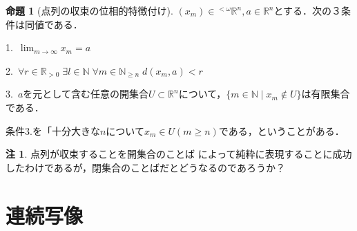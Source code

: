 \documentclass[uplatex, 12pt, dvipdfmx]{jsreport}
\theoremstyle{definition}
\newtheorem{proposition}[theorem]{命題}
\newtheorem{remark}[theorem]{注}
\theoremstyle{StatementsWithStar}
\theoremstyle{StatementsWithStar2}
\theoremstyle{StatementsWithStar3}
\theoremstyle{StatementsWithCCirc}
\theoremstyle{definition}
\begin{document}
\begin{proposition}[点列の収束の位相的特徴付け]\rm{}
    $(x_m)\in{}^{<\omega}\mathbb{R}^n, a\in\mathbb{R}^n$とする．次の３条件は同値である．

    1.\, $\lim_{m\to\infty}x_m=a$

    2.\, $\forall r\in\mathbb{R}_{>0}\;\exists l\in\mathbb{N}\;\forall m\in\mathbb{N}_{\ge n}\; d(x_m,a)<r$

    3.\, $a$を元として含む任意の開集合$U\subset\mathbb{R}^n$について，$\{m\in\mathbb{N}\mid x_m\notin U\}$は有限集合である．

    条件3.を「十分大きな$n$について$x_m\in U (m\ge n)$である，ということがある．
\end{proposition}
\begin{remark}
    点列が収束することを開集合のことば
    によって純粋に表現することに成功したわけであるが，閉集合のことばだとどうなるのであろうか？
\end{remark}

\section{連続写像}



\section{}
\end{document}
